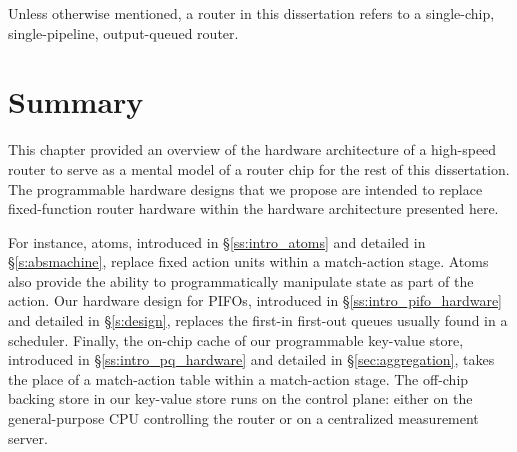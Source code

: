Unless otherwise mentioned, a router in this dissertation refers to a
single-chip, single-pipeline, output-queued router.

\section{Summary}
This chapter provided an overview of the hardware architecture of a high-speed
router to serve as a mental model of a router chip for the rest of this
dissertation.  The programmable hardware designs that we propose are intended
to replace fixed-function router hardware within the hardware architecture
presented here.

For instance, atoms, introduced in \S\ref{ss:intro_atoms} and detailed in
\S\ref{s:absmachine}, replace fixed action units within a match-action stage.
Atoms also provide the ability to programmatically manipulate state as part of
the action.  Our hardware design for PIFOs, introduced in
\S\ref{ss:intro_pifo_hardware} and detailed in \S\ref{s:design}, replaces the
first-in first-out queues usually found in a scheduler. Finally, the on-chip
cache of our programmable key-value store, introduced in
\S\ref{ss:intro_pq_hardware} and detailed in \S\ref{sec:aggregation}, takes the
place of a match-action table within a match-action stage. The off-chip backing
store in our key-value store runs on the control plane: either on the
general-purpose CPU controlling the router or on a centralized measurement
server.
